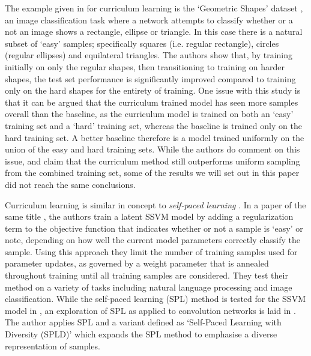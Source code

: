 The example given in \cite{Bengio2009}  for curriculum learning is the `Geometric Shapes' dataset \cite{GeoShapes}, an image classification task where a network attempts to classify whether or a not an image shows a rectangle, ellipse or triangle. In this case there is a natural subset of `easy' samples; specifically squares (i.e. regular rectangle), circles (regular ellipses) and equilateral triangles. The authors show that, by training initially on only the regular shapes, then transitioning to training on harder shapes, the test set performance is significantly improved compared to training only on the hard shapes for the entirety of training. One issue with this study is that it can be argued that the curriculum trained model has seen more samples overall than the baseline, as the curriculum model is trained on both an `easy' training set and a `hard' training set, whereas the baseline is trained only on the hard training set. A better baseline therefore is a model trained uniformly on the union of the easy and hard training sets. While the authors do comment on this issue, and claim that the curriculum method still outperforms uniform sampling from the combined training set, some of the results we will set out in this paper did not reach the same conclusions. 

Curriculum learning is similar in concept to \textit{self-paced learning} \cite{kumar2010self}. In a paper of the same title \cite{kumar2010self}, the authors train a latent SSVM model \cite{felzenszwalb2008discriminatively} by adding a regularization term to the objective function that indicates whether or not a sample is `easy' or note, depending on how well the current model parameters correctly classify the sample. Using this approach they limit the number of training samples used for parameter updates, as governed by a weight parameter that is annealed throughout training until all training samples are considered. They test their method on a variety of tasks including natural language processing and image classification. While the self-paced learning (SPL) method is tested for the SSVM model in \cite{kumar2010self}, an exploration of SPL as applied to convolution networks is laid in \cite{avramova2015curriculum}. The author applies SPL and a variant defined as `Self-Paced Learning with Diversity (SPLD)' \cite{jiang2014self} which expands the SPL method to emphasise a diverse representation of samples. 

